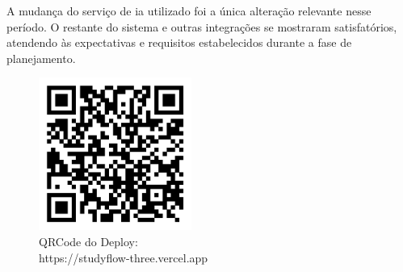 A mudança do serviço de \acs{ia} utilizado foi a única alteração relevante nesse período. O restante do sistema e outras integrações se mostraram satisfatórios, atendendo às expectativas e requisitos estabelecidos durante a fase de planejamento.

 \begin{figure}[!htb]
 	    \centering
 	    \caption{\label{logo}QRCode do Deploy: \\ https://studyflow-three.vercel.app}
 	    \includegraphics[width=5cm]{img/qrcode-plataforma.png}
\end{figure}
\FloatBarrier